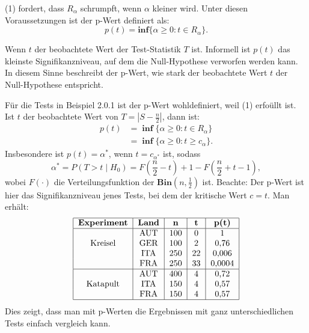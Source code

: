 \documentclass[10pt]{article}
\newenvironment{BSP}[1][]
{\begin{Beispiel}[frametitle=#1]}{\end{Beispiel}}
\begin{document}
	\begin{Definition}
		(1) fordert, dass $R_\alpha$ schrumpft, wenn $\alpha$ kleiner wird. Unter diesen Voraussetzungen ist der p-Wert definiert als:
		\begin{equation*}
			p(t) = \textbf{inf} \{\alpha \geq 0 : t \in R_\alpha\}. 
		\end{equation*}
	\end{Definition}
	Wenn $t$ der beobachtete Wert der Test-Statistik $T$ ist. Informell ist $p(t)$ das kleinste Signifikanzniveau, auf dem die Null-Hypothese verworfen werden kann. In diesem Sinne beschreibt der p-Wert, wie stark der beobachtete Wert $t$ der Null-Hypothese entspricht. 

	\begin{BSP}[Beispiel 2.0.2 (p-Wert)]
		Für die Tests in Beispiel 2.0.1 ist der p-Wert wohldefiniert, weil (1) erfoüllt ist.
		Ist $t$ der beobachtete Wert von $T = \left\vert S - \frac{n}{2} \right\vert$, dann ist:
		\begin{equation*}
			\begin{split}
				p(t) &= \; \textbf{inf} \; \{\alpha \geq 0: t \in R_\alpha\}\\
				&= \; \textbf{inf} \; \{\alpha \geq 0 : t \geq c_\alpha \}.
			\end{split}
		\end{equation*}
		Insbesondere ist $p(t) = \alpha^*$, wenn $t = c_{\alpha^*}$ ist, sodass
		\begin{equation*}
			\alpha^* = P(T > t \mid H_0) = F\left(\frac{n}{2} - t \right) + 1 - F\left(\frac{n}{2} + t -1\right),
		\end{equation*}
		wobei $F(\cdot)$ die Verteilungsfunktion der $\textbf{Bin}\left(n, \frac{1}{2} \right) $ ist.
		Beachte: Der p-Wert ist hier das Signifikanzniveau jenes Tests, bei dem der kritische Wert $c = t$. 
		Man erhält:
			\begin{align*}
			\begin{tabular}{|c|c|c|c|c|c|}
				\hline
				\textbf{Experiment} & \textbf{Land} & \textbf{n} & \textbf{t} & \textbf{p(t)}\\
				\hline
				& AUT & 100 & 0 & 1\\
				Kreisel & GER & 100 & 2 & 0,76\\
				& ITA & 250 & 22 & 0,006\\
				& FRA & 250 & 33 & 0,0004\\
				\hline
				& AUT & 400 & 4 & 0,72\\
				Katapult & ITA & 150 & 4 & 0,57\\
				& FRA & 150 & 4 & 0,57\\
				\hline
			\end{tabular}
		\end{align*}
		Dies zeigt, dass man mit p-Werten die Ergebnissen mit ganz unterschiedlichen Tests einfach vergleich kann. 
	\end{BSP}	
	
\end{document}

